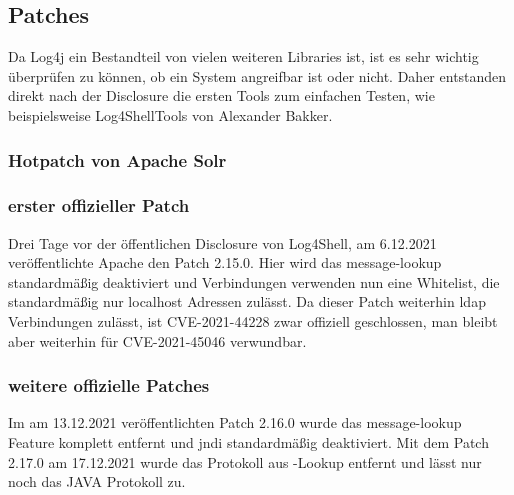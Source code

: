 
\subsection{Patches}\label{subsec:patches}
Da Log4j ein Bestandteil von vielen weiteren Libraries ist, ist es sehr wichtig überprüfen zu können, ob ein System angreifbar ist oder nicht.
Daher entstanden direkt nach der Disclosure die ersten Tools zum einfachen Testen, wie beispielsweise Log4ShellTools von Alexander Bakker.

\subsubsection{Hotpatch von Apache Solr}


\subsubsection{erster offizieller Patch}
Drei Tage vor der öffentlichen Disclosure von Log4Shell, am 6.12.2021 veröffentlichte Apache den Patch 2.15.0.
Hier wird das message-lookup standardmäßig deaktiviert und  Verbindungen verwenden nun eine Whitelist, die standardmäßig nur localhost Adressen zulässt.
Da dieser Patch weiterhin \gls{ldap} Verbindungen zulässt, ist CVE-2021-44228 zwar offiziell geschlossen, man bleibt aber weiterhin für CVE-2021-45046 verwundbar.

\subsubsection{weitere offizielle Patches}
Im am 13.12.2021 veröffentlichten Patch 2.16.0 wurde das message-lookup Feature komplett entfernt und \gls{jndi} standardmäßig deaktiviert.
Mit dem Patch 2.17.0 am 17.12.2021 wurde das  Protokoll aus -Lookup entfernt und lässt nur noch das JAVA Protokoll zu.
